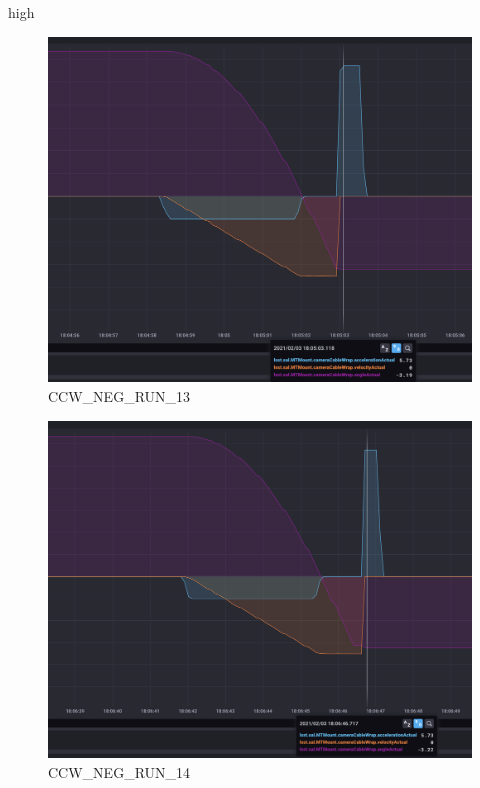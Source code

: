 high\documentclass[SE,lsstdraft,authoryear,toc]{lsstdoc}
\begin{document}
\begin{figure}[h!]
  \includegraphics[width=\linewidth]{media/CCW_design_speed_neg_test13.png}
  \caption{CCW\_NEG\_RUN\_13}
  \label{fig:CCW_NEG_RUN_13}
\end{figure}
\begin{figure}[h!]
  \includegraphics[width=\linewidth]{media/CCW_design_speed_neg_test14.png}
  \caption{CCW\_NEG\_RUN\_14}
  \label{fig:CCW_NEG_RUN_14}
\end{figure}
\end{document}
